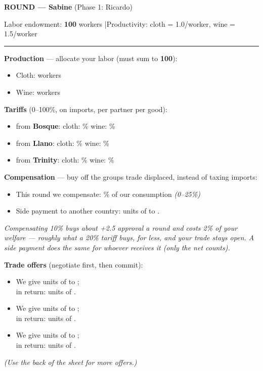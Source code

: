 \documentclass[11pt]{article}
\newcommand{\blank}[1]{\underline{\hspace{#1}}}
\newcommand{\hr}{\par\vspace{2pt}\noindent\rule{\linewidth}{0.4pt}\par\vspace{2pt}}
\begin{document}
{\large\bfseries ROUND \blank{1cm} --- Sabine} \hfill (Phase 1: Ricardo)\par
Labor endowment: \textbf{100} workers \quad|\quad Productivity: cloth = 1.0/worker, wine = 1.5/worker
\hr

{\bfseries Production} --- allocate your labor (must sum to \textbf{100}):\par
\begin{itemize}[nosep,leftmargin=1.4em]
  \item Cloth: \blank{2.5cm} workers
  \item Wine: \blank{2.5cm} workers
\end{itemize}

\vspace{4pt}
{\bfseries Tariffs} (0--100\%, on imports, per partner per good):\par
\begin{itemize}[nosep,leftmargin=1.4em]
  \item from \textbf{Bosque}: \quad cloth: \blank{1.4cm}\% \quad wine: \blank{1.4cm}\%
  \item from \textbf{Llano}: \quad cloth: \blank{1.4cm}\% \quad wine: \blank{1.4cm}\%
  \item from \textbf{Trinity}: \quad cloth: \blank{1.4cm}\% \quad wine: \blank{1.4cm}\%
\end{itemize}

\vspace{4pt}
{\bfseries Compensation} --- buy off the groups trade displaced, instead of taxing imports:\par
\begin{itemize}[nosep,leftmargin=1.4em]
  \item This round we compensate: \blank{1.4cm}\% of our consumption \quad \textit{(0--25\%)}
  \item Side payment to another country: \blank{1.6cm} units of \blank{2cm} to \blank{2.2cm}.
\end{itemize}
\textit{Compensating 10\% buys about +2.5 approval a round and costs 2\% of your welfare --- roughly what a 20\% tariff buys, for less, and your trade stays open. A side payment does the same for whoever receives it (only the net counts).}

\vspace{4pt}
{\bfseries Trade offers} (negotiate first, then commit):\par
\begin{itemize}[itemsep=4pt,leftmargin=1.4em]
  \item We give \blank{1.8cm} units of \blank{2.2cm} to \blank{2.2cm};\\[2pt] in return: \blank{1.8cm} units of \blank{2.2cm}.
  \item We give \blank{1.8cm} units of \blank{2.2cm} to \blank{2.2cm};\\[2pt] in return: \blank{1.8cm} units of \blank{2.2cm}.
  \item We give \blank{1.8cm} units of \blank{2.2cm} to \blank{2.2cm};\\[2pt] in return: \blank{1.8cm} units of \blank{2.2cm}.
\end{itemize}
\textit{(Use the back of the sheet for more offers.)}
\end{document}
